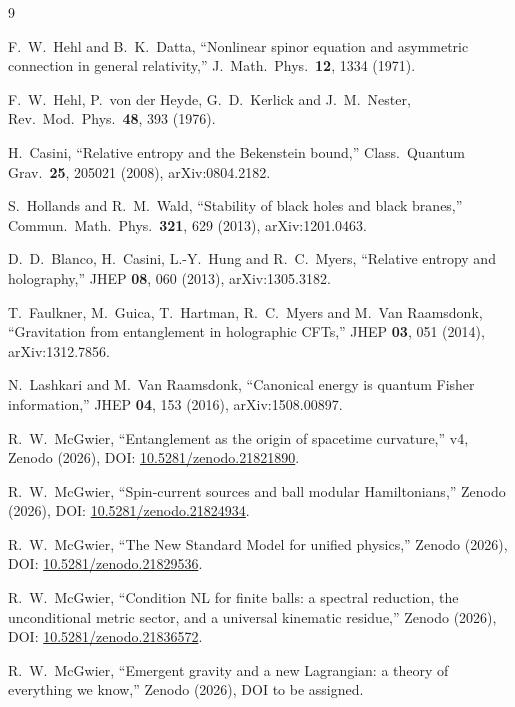 \documentclass[11pt]{article}
\theoremstyle{definition}
\begin{document}
\begin{thebibliography}{9}\small

F.~W.~Hehl and B.~K.~Datta, ``Nonlinear spinor equation and asymmetric
connection in general relativity,''
J.\ Math.\ Phys.\ \textbf{12}, 1334 (1971).

F.~W.~Hehl, P.~von der Heyde, G.~D.~Kerlick and J.~M.~Nester,
Rev.\ Mod.\ Phys.\ \textbf{48}, 393 (1976).

H.~Casini, ``Relative entropy and the Bekenstein bound,''
Class.\ Quantum Grav.\ \textbf{25}, 205021 (2008), arXiv:0804.2182.

S.~Hollands and R.~M.~Wald, ``Stability of black holes and black
branes,'' Commun.\ Math.\ Phys.\ \textbf{321}, 629 (2013),
arXiv:1201.0463.

D.~D.~Blanco, H.~Casini, L.-Y.~Hung and R.~C.~Myers, ``Relative entropy
and holography,'' JHEP \textbf{08}, 060 (2013), arXiv:1305.3182.

T.~Faulkner, M.~Guica, T.~Hartman, R.~C.~Myers and M.~Van Raamsdonk,
``Gravitation from entanglement in holographic CFTs,''
JHEP \textbf{03}, 051 (2014), arXiv:1312.7856.

N.~Lashkari and M.~Van Raamsdonk, ``Canonical energy is quantum Fisher
information,'' JHEP \textbf{04}, 153 (2016), arXiv:1508.00897.

R.~W.~McGwier, ``Entanglement as the origin of spacetime curvature,''
v4, Zenodo (2026), DOI:
\href{https://doi.org/10.5281/zenodo.21821890}{10.5281/zenodo.21821890}.

R.~W.~McGwier, ``Spin-current sources and ball modular Hamiltonians,''
Zenodo (2026), DOI:
\href{https://doi.org/10.5281/zenodo.21824934}{10.5281/zenodo.21824934}.

R.~W.~McGwier, ``The New Standard Model for unified physics,''
Zenodo (2026), DOI:
\href{https://doi.org/10.5281/zenodo.21829536}{10.5281/zenodo.21829536}.

R.~W.~McGwier, ``Condition NL for finite balls: a spectral reduction,
the unconditional metric sector, and a universal kinematic residue,''
Zenodo (2026), DOI:
\href{https://doi.org/10.5281/zenodo.21836572}{10.5281/zenodo.21836572}.

R.~W.~McGwier, ``Emergent gravity and a new Lagrangian: a theory of everything we know,''
Zenodo (2026), DOI to be assigned.

\end{thebibliography}
\end{document}
